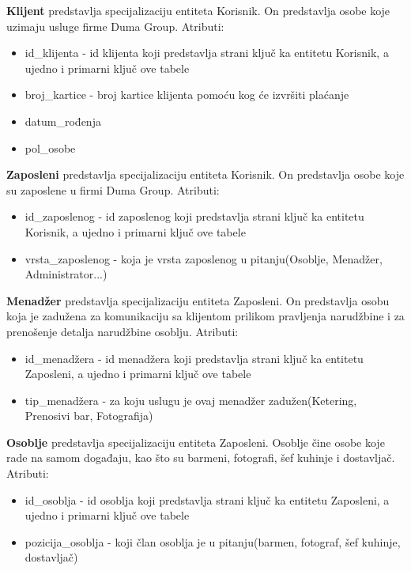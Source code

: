 \documentclass[a4paper]{article}
\begin{document}
\vspace{3mm}

\textbf{Klijent} predstavlja specijalizaciju entiteta Korisnik. On predstavlja osobe koje uzimaju usluge firme Duma Group. Atributi:
\begin{itemize}
    \item id\_klijenta - id klijenta koji predstavlja strani ključ ka entitetu Korisnik, a ujedno i primarni ključ ove tabele
    \item broj\_kartice - broj kartice klijenta pomoću kog će izvršiti plaćanje
    \item datum\_rođenja
    \item pol\_osobe
\end{itemize}

\vspace{3mm}

\textbf{Zaposleni} predstavlja specijalizaciju entiteta Korisnik. On predstavlja osobe koje su zaposlene u firmi Duma Group. Atributi:
\begin{itemize}
    \item id\_zaposlenog - id zaposlenog koji predstavlja strani ključ ka entitetu Korisnik, a ujedno i primarni ključ ove tabele
    \item vrsta\_zaposlenog - koja je vrsta zaposlenog u pitanju(Osoblje, Menadžer, Administrator...)
\end{itemize}

\vspace{3mm}

\textbf{Menadžer} predstavlja specijalizaciju entiteta Zaposleni. On predstavlja osobu koja je zadužena za komunikaciju sa klijentom prilikom pravljenja narudžbine i za prenošenje detalja narudžbine osoblju. Atributi:
\begin{itemize}
    \item id\_menadžera - id menadžera koji predstavlja strani ključ ka entitetu Zaposleni, a ujedno i primarni ključ ove tabele
    \item tip\_menadžera - za koju uslugu je ovaj menadžer zadužen(Ketering, Prenosivi bar, Fotografija) 
\end{itemize}

\vspace{3mm}

\textbf{Osoblje} predstavlja specijalizaciju entiteta Zaposleni. Osoblje čine osobe koje rade na samom događaju, kao što su barmeni, fotografi, šef kuhinje i dostavljač. Atributi:
\begin{itemize}
    \item id\_osoblja - id osoblja koji predstavlja strani ključ ka entitetu Zaposleni, a ujedno i primarni ključ ove tabele
    \item pozicija\_osoblja - koji član osoblja je u pitanju(barmen, fotograf, šef kuhinje, dostavljač) 
\end{itemize}
\end{document}
